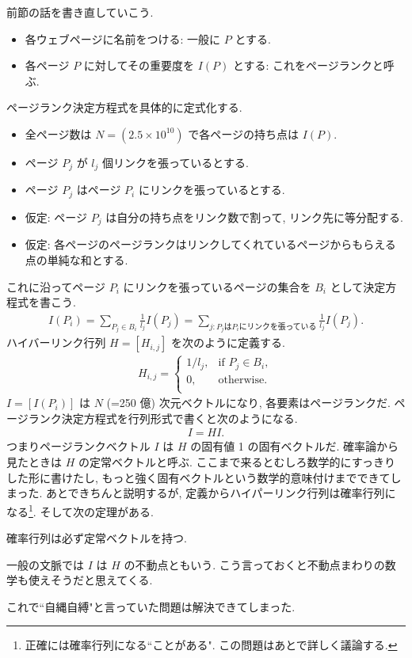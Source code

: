 \documentclass[openany, a4paper, oneside]{jsbook}
\begin{document}
前節の話を書き直していこう.
\begin{itemize}
\item 各ウェブページに名前をつける: 一般に $P$ とする.
\item 各ページ $P$ に対してその重要度を $I (P)$ とする: これをページランクと呼ぶ.
\end{itemize}
ページランク決定方程式を具体的に定式化する.
\begin{itemize}
\item 全ページ数は $N = (2.5 \times 10^{10})$ で各ページの持ち点は $I(P)$.
\item ページ $P_j$ が $l_j$ 個リンクを張っているとする.
\item ページ $P_j$ はページ $P_i$ にリンクを張っているとする.
\item 仮定: ページ $P_j$ は自分の持ち点をリンク数で割って, リンク先に等分配する.
\item 仮定: 各ページのページランクはリンクしてくれているページからもらえる点の単純な和とする.
\end{itemize}
これに沿ってページ $P_i$ にリンクを張っているページの集合を $B_i$ として決定方程式を書こう.
\begin{align}
 I (P_i)
 =
 \sum_{P_j \in B_i} \frac{ 1 }{ l_j }I (P_j)
 =
 \sum_{j:P_j \text{は} P_i \text{にリンクを張っている}}\frac{ 1 }{ l_j }I (P_j).
\end{align}
ハイバーリンク行列 $H=[H_{i,j}]$ を次のように定義する.
\begin{align}
 H_{i,j}
 =
 \begin{cases}
 1/l_j, & \text{if } P_j \in B_i, \\
 0, & \text{otherwise}. \\
 \end{cases} \label{linear-algebra-google-pagerank5}
\end{align}
$I=[I (P_i)]$ は $N$ (=250 億) 次元ベクトルになり, 各要素はページランクだ.
ページランク決定方程式を行列形式で書くと次のようになる.
\begin{align}
 I
 =
 HI. \label{linear-algebra-google-pagerank6}
\end{align}
つまりページランクベクトル $I$ は $H$ の固有値 1 の固有ベクトルだ.
確率論から見たときは $H$ の定常ベクトルと呼ぶ.
ここまで来るとむしろ数学的にすっきりした形に書けたし,
もっと強く固有ベクトルという数学的意味付けまでできてしまった.
あとできちんと説明するが, 定義からハイパーリンク行列は確率行列になる\footnote{正確には確率行列になる``ことがある".
この問題はあとで詳しく議論する.}.
そして次の定理がある.
\begin{thm}
確率行列は必ず定常ベクトルを持つ.
\end{thm}
\begin{rem}
一般の文脈では $I$ は $H$ の不動点ともいう.
こう言っておくと不動点まわりの数学も使えそうだと思えてくる.
\end{rem}
これで``自縄自縛"と言っていた問題は解決できてしまった.
\end{document}
